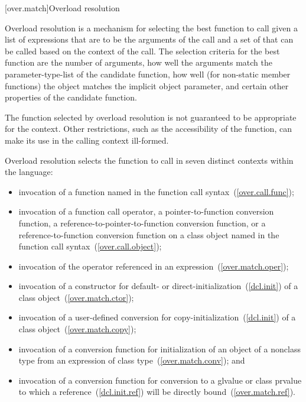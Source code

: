 [over.match]{Overload resolution}%
%
%

\pnum
Overload resolution is a mechanism for selecting the best
function to call given a list of expressions that are to be the
arguments of the call and a set of
that can
be called based on the context of the call.
The selection
criteria for the best function are the number of arguments, how
well the arguments match the parameter-type-list of the
candidate function,
how well (for non-static member functions) the object
matches the implicit object parameter,
and certain other properties of the candidate function.
\begin{note}
The function selected by overload resolution is not
guaranteed to be appropriate for the context.
Other restrictions,
such as the accessibility of the function, can make its use in
the calling context ill-formed.
\end{note}

\pnum
{}%
Overload resolution selects the function to call in seven distinct
contexts within the language:

\begin{itemize}
\item
invocation of a function named in the function call syntax~(\ref{over.call.func});
\item
invocation of a function call operator, a pointer-to-function
conversion function, a reference-to-pointer-to-function conversion
function, or a reference-to-function
conversion function on a class object named in the function
call syntax~(\ref{over.call.object});
\item
invocation of the operator referenced in an expression~(\ref{over.match.oper});
\item
invocation of a constructor for default- or direct-initialization~(\ref{dcl.init})
of a class object~(\ref{over.match.ctor});
\item
invocation of a user-defined conversion for
copy-initialization~(\ref{dcl.init}) of a class object~(\ref{over.match.copy});
\item
invocation of a conversion function for initialization of an object of a
nonclass type from an expression of class type~(\ref{over.match.conv}); and
\item
invocation of a conversion function for conversion to a glvalue
or class prvalue
to which a reference~(\ref{dcl.init.ref})
will be directly bound~(\ref{over.match.ref}).
\end{itemize}

